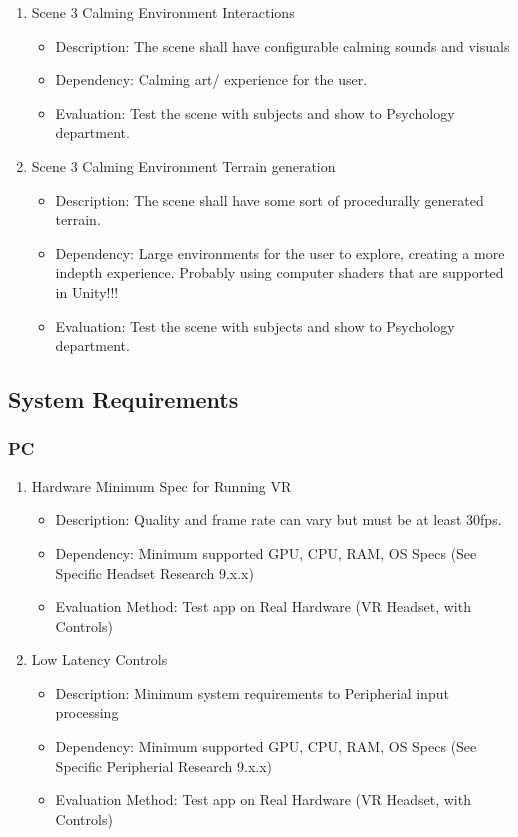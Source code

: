 \documentclass[a4paper,10pt,twoside]{article}
\begin{document}
\begin{enumerate}
		\item Scene 3 Calming Environment Interactions 
		\begin{itemize}
		\item Description: The scene shall have configurable calming sounds and visuals
		\item Dependency: Calming art/ experience for the user.
		\item Evaluation: Test the scene with subjects and show to Psychology department. 
		\end{itemize}
		
		\item Scene 3 Calming Environment Terrain generation
		\begin{itemize}
		\item Description: The scene shall have some sort of procedurally generated terrain. 
		\item Dependency: Large environments for the user to explore, creating a more indepth experience. Probably using computer shaders that are supported in Unity!!!
		\item Evaluation: Test the scene with subjects and show to Psychology department. 
		\end{itemize}
		
	\end{enumerate}

	\subsection{System Requirements}
	\subsubsection{PC}
		\begin{enumerate}
			\item Hardware Minimum Spec for Running VR
			\begin{itemize}
				\item Description: Quality and frame rate can vary but must be at least 30fps.
				\item Dependency: Minimum supported GPU, CPU, RAM, OS Specs (See Specific Headset Research 9.x.x) 
				\item Evaluation Method: Test app on Real Hardware (VR Headset, with Controls)
			\end{itemize}
			\item Low Latency Controls
			\begin{itemize}
				\item Description: Minimum system requirements to Peripherial input processing
				\item Dependency: Minimum supported GPU, CPU, RAM, OS Specs (See Specific Peripherial Research 9.x.x) 
				\item Evaluation Method: Test app on Real Hardware (VR Headset, with Controls)
			\end{itemize}
		\end{enumerate}
\end{document}
